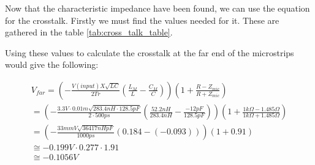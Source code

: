 \documentclass[../main.tex]{subfiles}
\begin{document}
\newpage

Now that the characteristic impedance have been found, we can use the equation for the crosstalk. Firstly we must find the values needed for it. These are gathered in the table \ref{tab:cross_talk_table}.

\begin{table}[h]
\caption{Table over needed values for calculating the crosstalk}
\label{tab:cross_talk_table}
\end{table}

Using these values to calculate the crosstalk at the far end of the microstrips would give the following:

\begin{multline}
    V_{far} = \left(-\frac{V(input)X\sqrt{LC}}{2Tr} \left(\frac{L_M}{L} - \frac{C_M}{C} \right) \right) \left(1+ \frac{R-Z_{mic}}{R+Z_{mic}} \right) \\
    = \left(-\frac{3.3V \cdot 0.01m\sqrt{283.4 nH \cdot 128.5 pF}}{2 \cdot 500 ps} \left(\frac{52.2 nH}{283.4 nH} - \frac{-12 pF}{128.5 pF} \right) \right) \left(1+ \frac{1k\Omega - 1.485\Omega}{1k\Omega+1.485\Omega} \right) \\ 
  = \left(-\frac{33mmV\sqrt{36417 nHpF}}{1000 ps} \left(0.184 - (-0.093) \right) \right) \left(1+ 0.91 \right) \\
  \cong -0.199V  \cdot 0.277 \cdot 1.91 \\ \cong -0.1056 V
\label{eq:FEXT_microstrip}
\end{multline}
\end{document}
